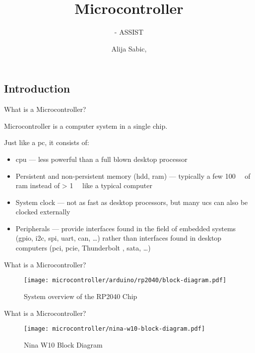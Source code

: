 \documentclass[aspectratio=169]{beamer}
\title[Microcontroller]{Microcontroller}
\subtitle{\glsentrytext{ci} - ASSIST \glsentrytext{heidi}}
\author{Alija Sabic, \glsentrytext{msc}}
\institute{Department Electronic Engineering}
\begin{document}
\begin{frame}[plain]
    \titlepage
\end{frame}

\section{}

\subsection{Introduction}

\begin{frame}{What is a Microcontroller?}
    \par Microcontroller is a computer system in a single chip.
    \par Just like a \acs{pc}, it consists of:
    \begin{itemize}
        \item \acs{cpu} --- less powerful than a full blown desktop processor
        \item Persistent and non-persistent memory (\acs{hdd}, \acs{ram}) --- typically a few \SI{100}{\kibi\byte} of \acs{ram} instead of > \SI{1}{\gibi\byte} like a typical computer
        \item System clock --- not as fast as desktop processors, but many \acsp{uc} can also be clocked externally
        \item Peripherals --- provide interfaces found in the field of embedded systems (\acs{gpio}, \acs{i2c}, \acs{spi}, \acs{uart}, \acs{can}, \ldots) rather than interfaces found in desktop computers (\acs{pci}, \acs{pcie}, Thunderbolt \texttrademark, \acs{sata}, \ldots)
    \end{itemize}
\end{frame}

\begin{frame}{What is a Microcontroller?}
    \begin{figure}
        \texttt{[image: microcontroller/arduino/rp2040/block-diagram.pdf]}
        \caption{System overview of the RP2040 Chip}
    \end{figure}
\end{frame}

\begin{frame}{What is a Microcontroller?}
    \begin{figure}
        \texttt{[image: microcontroller/nina-w10-block-diagram.pdf]}
        \caption{Nina W10 Block Diagram}
    \end{figure}
\end{frame}
\end{document}
